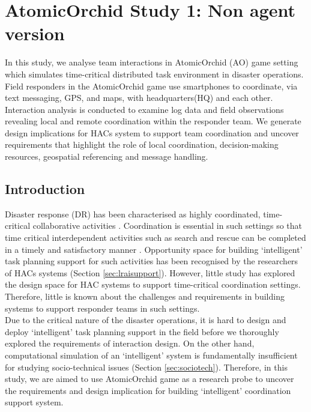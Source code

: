 \chapter{AtomicOrchid Study 1: Non agent version}\label{ch:studyone} %
In this study, we analyse team interactions in AtomicOrchid (AO) game setting which simulates time-critical distributed task environment in disaster operations. Field responders in the AtomicOrchid game use smartphones to coordinate, via text messaging, GPS, and maps, with headquarters(HQ) and each other. Interaction analysis is conducted to examine log data and field observations revealing local and remote coordination within the responder team. We generate design implications for HACs system to support team coordination and uncover requirements that highlight the role of local coordination, decision-making resources, geospatial referencing and message handling. \\


\section{Introduction}
Disaster response (DR) has been characterised as highly coordinated, time-critical collaborative activities  \cite{Mendonca2007}. Coordination is essential in such settings so that time critical interdependent activities such as search and rescue can be completed in a timely and satisfactory manner \cite{Bradshaw2011}. Opportunity space for building `intelligent' task planning support for  such activities has been recognised by the researchers of HACs systems (Section \ref{sec:lraisupport}). However, little study has explored the  design space for HAC systems to support time-critical coordination settings. Therefore, little is known about the challenges and requirements in building systems to support responder teams in such settings.\\

Due to the critical nature of the disaster operations, it is hard to design and deploy `intelligent' task planning support in the field before we thoroughly explored the requirements of interaction design. On the other hand, computational simulation of an `intelligent' system is fundamentally insufficient for studying socio-technical issues (Section \ref{sec:sociotech}). Therefore, in this study, we are aimed to use AtomicOrchid game as a research probe to uncover the requirements and design implication for building `intelligent' coordination support system. \\

